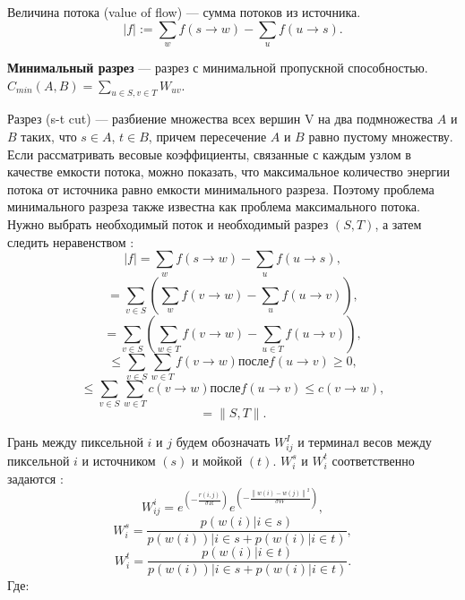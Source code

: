 Величина потока (value of flow) — сумма потоков из источника.
\[
\left|f\right|:= \sum_w f \left(s\rightarrow w\right) - \sum_u f\left(u\rightarrow s\right).
\]

\textbf{Минимальный разрез} — разрез с минимальной пропускной способностью. 
$C_{min} \left(A,B\right)=\sum_{u\in S, v \in T} W_{uv}$.

Разрез (s-t cut) — разбиение множества всех вершин V на два подмножества $A$ и $B$ таких, что $s\in A $, $t\in B$, причем пересечение $A$ и $B$ равно пустому множеству. Если рассматривать весовые коэффициенты, связанные с каждым узлом в качестве емкости потока, можно показать, что максимальное количество энергии потока от источника равно емкости минимального разреза. Поэтому проблема минимального разреза также известна как проблема максимального потока. Нужно выбрать необходимый поток и необходимый разрез $\left(S, T\right)$, а затем следить неравенством \cite{Boykov12001}:
\begin{equation}\label{eq21}
\left|f\right| = \sum_w f\left(s\rightarrow w\right) - \sum_u f \left(u\rightarrow s\right),
\end{equation}
\[
=\sum_{v\in S}\left(\sum_w f \left(v \rightarrow w \right) - \sum_u f\left( u \rightarrow v \right) \right),
\]
\[
= \sum_{v \in S} \left(\sum_{w \in T} f \left( v \rightarrow w\right) - \sum_{u \in T} f \left( u \rightarrow v \right)\right),
\]
\[
\leq \sum_{v \in S}\sum_{w \in T} f \left( v \rightarrow w \right) после  f \left(u \rightarrow v\right) \geq 0,
\]
\[
\leq \sum_{v \in S}\sum_{w \in T} c \left(v\rightarrow w \right)  после f \left(u \rightarrow v \right) \leq c \left( v \rightarrow w\right),
\]
\[
=\left\|S, T\right\|.
\]

Грань между пиксельной $i$ и $j$ будем обозначать $W^I_{ij}$ и терминал весов между пиксельной $i$ и источником $\left(s\right)$ и мойкой $\left(t\right)$. $W^s_i$ и $W^t_i$ соответственно задаются \cite{Parvathy}:
\begin{equation}\label{eq22}
W^i_{ij} = e^{\left(-\frac{r\left(i,j\right)}{\sigma R}\right)}e^{\left(-\frac{\left\|w\left(i\right)-w\left(j\right)\right\|^2}{\sigma W}\right)},
\end{equation}
\begin{equation}\label{eq23}
W^s_i = \frac{p\left(w\left(i\right)| i \in s\right)}{p \left(w \left(i\right)\right)|i \in s + p \left(w\left(i\right)|i \in t\right)},
\end{equation}
\begin{equation}\label{eq24}
W^t_i = \frac{p\left(w\left(i\right) | i \in t\right)}{p \left(w \left(i\right)\right)|i \in s + p \left(w\left(i\right)|i \in t\right)}.
\end{equation}
Где:

